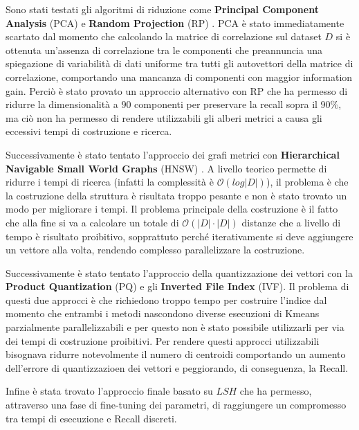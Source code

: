 Sono stati testati gli algoritmi di riduzione come \textbf{Principal Component Analysis} (PCA) \cite{pca}
e \textbf{Random Projection} (RP) \cite{rp}. PCA è stato immediatamente scartato dal momento che 
calcolando la matrice di correlazione sul dataset $D$ si è ottenuta un'assenza 
di correlazione tra le componenti che preannuncia una spiegazione di variabilità 
di dati uniforme tra tutti gli autovettori della matrice di correlazione, comportando 
una mancanza di componenti con maggior information gain. Perciò è stato provato 
un approccio alternativo con RP che ha permesso di ridurre la 
dimensionalità a $90$ componenti per preservare la recall sopra il $90\%$, ma 
ciò non ha permesso di rendere utilizzabili gli alberi metrici a causa gli eccessivi 
tempi di costruzione e ricerca.

Successivamente è stato tentato l'approccio dei grafi metrici con \textbf{Hierarchical 
Navigable Small World Graphs} (HNSW) \cite{hnsw}. A livello teorico permette di ridurre i tempi
di ricerca (infatti la complessità è $\mathcal{O}(log |D|)$), il problema è 
che la costruzione della struttura è risultata troppo pesante e non è stato trovato 
un modo per migliorare i tempi. Il problema principale della costruzione è 
il fatto che alla fine si va a calcolare un totale di $\mathcal{O}(|D|\cdot |D|)$
distanze che a livello di tempo è risultato proibitivo, sopprattuto perché 
iterativamente si deve aggiungere un vettore alla volta, rendendo complesso parallelizzare 
la costruzione.

Successivamente è stato tentato l'approccio della quantizzazione dei vettori con 
la \textbf{Product Quantization} (PQ) \cite{pq} e gli \textbf{Inverted File Index} (IVF)\cite{pq}. Il problema di questi 
due approcci è che richiedono troppo tempo per costruire l'indice dal momento che 
entrambi i metodi nascondono diverse esecuzioni di Kmeans parzialmente parallelizzabili
e per questo non è stato possibile utilizzarli per via dei tempi di costruzione 
proibitivi. Per rendere questi approcci utilizzabili bisognava ridurre notevolmente 
il numero di centroidi comportando un aumento dell'errore di quantizzazioen dei 
vettori e peggiorando, di conseguenza, la Recall.

Infine è stata trovato l'approccio finale basato su $LSH$ che ha permesso, attraverso 
una fase di fine-tuning dei parametri, di raggiungere un compromesso tra tempi di 
esecuzione e Recall discreti.
